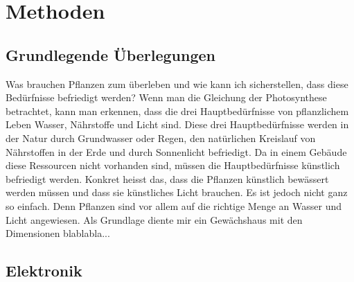 \section{Methoden}
\label{sec:methode}

\subsection{Grundlegende Überlegungen}
Was brauchen Pflanzen zum überleben und wie kann ich sicherstellen, dass diese Bedürfnisse befriedigt werden? \newline Wenn man die Gleichung der Photosynthese betrachtet, kann man erkennen, dass die drei Hauptbedürfnisse von pflanzlichem Leben Wasser, Nährstoffe und Licht sind. Diese drei Hauptbedürfnisse werden in der Natur durch Grundwasser oder Regen, den natürlichen Kreislauf von Nährstoffen in der Erde und durch Sonnenlicht befriedigt. Da in einem Gebäude diese Ressourcen nicht vorhanden sind, müssen die Hauptbedürfnisse künstlich befriedigt werden. Konkret heisst das, dass die Pflanzen künstlich bewässert werden müssen und dass sie künstliches Licht brauchen. Es ist jedoch nicht ganz so einfach. Denn Pflanzen sind vor allem auf die richtige Menge an Wasser und Licht angewiesen. \newline Als Grundlage diente mir ein Gewächshaus mit den Dimensionen blablabla...
\subsection{Elektronik}
